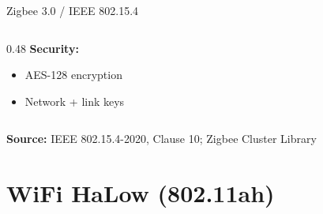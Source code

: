 \documentclass[aspectratio=169,11pt]{beamer}
\begin{document}
\begin{frame}{Zigbee 3.0 / IEEE 802.15.4}
\begin{columns}[T]
\begin{column}{0.48\textwidth}
            \vspace{0.2cm}
            \textbf{Security:}
            \begin{itemize}
                \item AES-128 encryption
                \item Network + link keys
            \end{itemize}
        \end{column}
    \end{columns}
    
    \vspace{0.2cm}
    \textbf{Source:} IEEE 802.15.4-2020, Clause 10; Zigbee Cluster Library
\end{frame}

\section{WiFi HaLow (802.11ah)}
\end{document}
